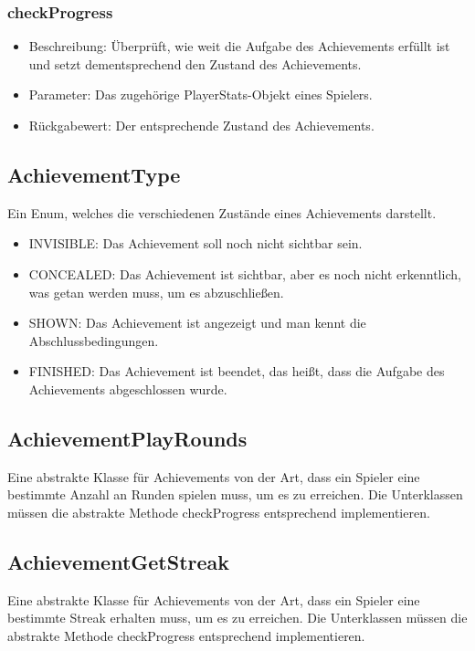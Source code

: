 \documentclass[a4paper]{scrreprt}
\begin{document}
	\subsubsection{checkProgress}
	\begin{itemize}
		\item Beschreibung: Überprüft, wie weit die Aufgabe des Achievements erfüllt ist und setzt dementsprechend den Zustand des Achievements.
		\item Parameter: Das zugehörige PlayerStats-Objekt eines Spielers.
		\item Rückgabewert: Der entsprechende Zustand des Achievements.
	\end{itemize}

	\subsection{AchievementType}
	Ein Enum, welches die verschiedenen Zustände eines Achievements darstellt.

	\begin{itemize}
		\item INVISIBLE: Das Achievement soll noch nicht sichtbar sein.
		\item CONCEALED: Das Achievement ist sichtbar, aber es noch nicht erkenntlich, was getan werden muss, um es abzuschließen.
		\item SHOWN: Das Achievement ist angezeigt und man kennt die Abschlussbedingungen.
		\item FINISHED: Das Achievement ist beendet, das heißt, dass die Aufgabe des Achievements abgeschlossen wurde.
	\end{itemize}

	\subsection{AchievementPlayRounds}
	Eine abstrakte Klasse für Achievements von der Art, dass ein Spieler eine bestimmte Anzahl an Runden spielen muss, um es zu erreichen. Die Unterklassen müssen die abstrakte Methode checkProgress entsprechend implementieren.

	\subsection{AchievementGetStreak}
	Eine abstrakte Klasse für Achievements von der Art, dass ein Spieler eine bestimmte Streak erhalten muss, um es zu erreichen. Die Unterklassen müssen die abstrakte Methode checkProgress entsprechend implementieren.
\end{document}
